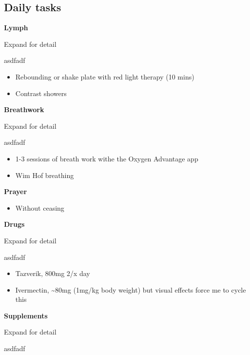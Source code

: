 \documentclass[
  letterpaper,
  DIV=11,
  numbers=noendperiod]{scrreprt}
\providecommand{\tightlist}{%
  \setlength{\itemsep}{0pt}\setlength{\parskip}{0pt}}\usepackage{longtable,booktabs,array}
\begin{document}
\subsection*{Daily tasks}\label{daily-tasks}

\textbf{Lymph}

Expand for detail

asdfadf

\begin{itemize}
\item
  Rebounding or shake plate with red light therapy (10 mins)
\item
  Contrast showers
\end{itemize}

\textbf{Breathwork}

Expand for detail

asdfadf

\begin{itemize}
\item
  1-3 sessions of breath work withe the Oxygen Advantage app
\item
  Wim Hof breathing
\end{itemize}

\textbf{Prayer}

\begin{itemize}
\tightlist
\item
  Without ceasing
\end{itemize}

\textbf{Drugs}

Expand for detail

asdfadf

\begin{itemize}
\item
  Tazverik, 800mg 2/x day
\item
  Ivermectin, \textasciitilde80mg (1mg/kg body weight) but visual
  effects force me to cycle this
\end{itemize}

\textbf{Supplements}

Expand for detail

asdfadf
\end{document}
